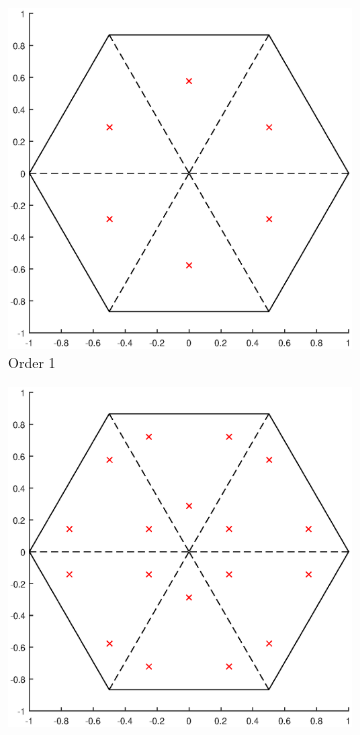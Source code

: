 \begin{figure}
\centering
{
	\begin{subfigure}[b]{0.475\textwidth}
		\centering
		\label{subfig::2DInt_V6_Q1}
		\includegraphics[width=\textwidth]{figures/sec_BF/V6_Q1.eps}
		\caption{Order 1}
	\end{subfigure}
	\hfill
	\begin{subfigure}[b]{0.475\textwidth}
		\centering
		\label{subfig::2DInt_V6_Q2}
		\includegraphics[width=\textwidth]{figures/sec_BF/V6_Q2.eps}

\end{subfigure}}
\end{figure}
